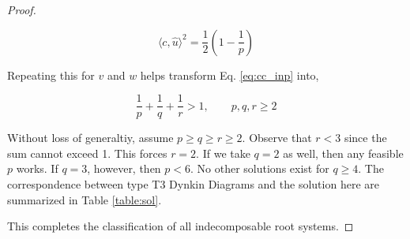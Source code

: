 \begin{proof}
\begin{enumerate}
        \begin{equation*}
            \langle c, \hat u \rangle^2 = \frac{1}{2} \left(1 - \frac{1}{p} \right)
        \end{equation*}

        Repeating this for $v$ and $w$ helps transform Eq. \ref{eq:cc_inp} into,

        \begin{equation}
            \label{eq:ineq}
            \frac{1}{p} + \frac{1}{q} + \frac{1}{r} > 1, \quad\quad p,q,r \geq 2
        \end{equation}

        Without loss of generaltiy, assume $p \geq q \geq r \geq 2$. Observe that $r < 3$ since the sum cannot exceed 1. This forces
        $r = 2$. If we take $q=2$ as well, then any feasible $p$ works. If $q=3$, however, then $p < 6$. No other solutions exist for
        $q \geq 4$. The correspondence between type T3 Dynkin Diagrams and the solution here are summarized in Table \ref{table:sol}.
    \end{enumerate}
    
    This completes the classification of all indecomposable root systems.

\end{proof}